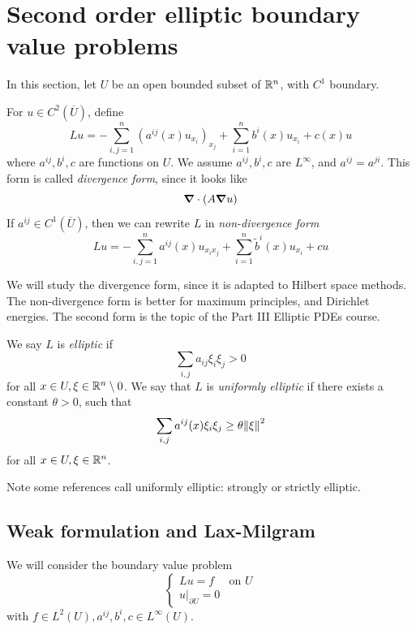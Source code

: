 \documentclass{article}
\begin{document}
\section{Second order elliptic boundary value problems}

In this section, let \(U\) be an open bounded subset of \(\mathbb{R}^n\), with \(C^1\) boundary.

For \(u \in C^2(\overline U)\), define
\begin{equation}
    \label{eq:elliptic-operator-div-form}
    Lu = -\sum_{i, j=1}^n(a^{ij}(x)u_{x_i})_{x_j} + \sum_{i=1}^n b^i(x)u_{x_i} + c(x)u
\end{equation}
where \(a^{ij}, b^i, c\) are functions on \(U\). We assume \(a^{ij}, b^i, c\) are \(L^\infty\), and \(a^{ij} = a^{ji}\). This form is called \emph{divergence form}, since it looks like
\[\grad\cdot(A \grad u)\]
If \(a^{ij} \in C^1(\overline U)\), then we can rewrite \(L\) in \emph{non-divergence form}
\[Lu = -\sum_{i, j=1}^n a^{ij}(x)u_{x_ix_j} + \sum_{i=1}^n \tilde b^i(x)u_{x_i} + cu\]

We will study the divergence form, since it is adapted to Hilbert space methods. The non-divergence form is better for maximum principles, and Dirichlet energies. The second form is the topic of the Part III Elliptic PDEs course.

\begin{definition}
    We say \(L\) is \emph{elliptic} if
    \[\sum_{i, j}a_{ij}\xi_i\xi_j > 0\]
    for all \(x \in U, \xi \in \mathbb{R}^n \setminus 0\). We say that \(L\) is \emph{uniformly elliptic} if there exists a constant \(\theta > 0\), such that
    \[\sum_{i, j}a^{ij}(x)\xi_i\xi_j \ge \theta\norm{\xi}^2\]
    for all \(x \in U, \xi \in \mathbb{R}^n\). 
\end{definition}

Note some references call uniformly elliptic: strongly or strictly elliptic.

\subsection{Weak formulation and Lax-Milgram}

We will consider the boundary value problem
\begin{equation}
    \label{eq:elliptic-bvp}
    \begin{cases}
        Lu = f &\text{on }U \\
        u\vert_{\partial U} = 0
    \end{cases}
\end{equation}
with \(f \in L^2(U), a^{ij}, b^i, c \in L^\infty(U)\).
\end{document}
